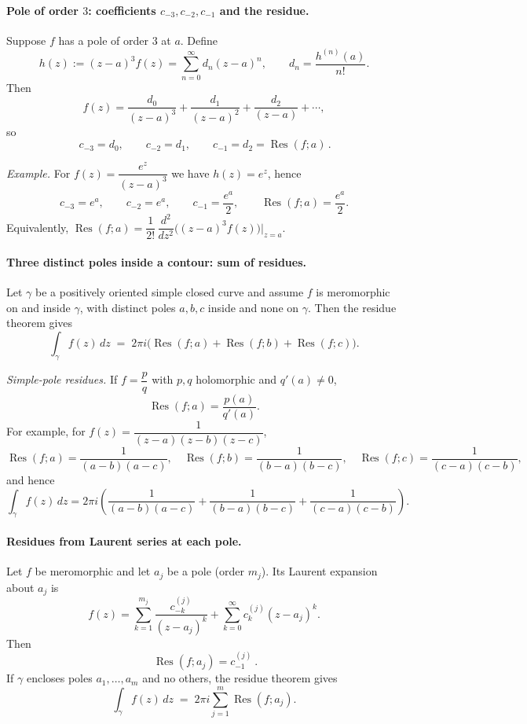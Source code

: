 \documentclass[11pt,a4paper]{article}
\theoremstyle{definition}
\theoremstyle{definition}
\theoremstyle{plain}
\theoremstyle{remark}
\DeclareMathOperator{\Res}{Res}
\begin{document}
\paragraph{Pole of order $3$: coefficients $c_{-3},c_{-2},c_{-1}$ and the residue.}
Suppose $f$ has a pole of order $3$ at $a$. Define
\[
h(z):=(z-a)^3 f(z)=\sum_{n=0}^{\infty} d_n (z-a)^n, \qquad d_n=\frac{h^{(n)}(a)}{n!}.
\]
Then
\[
f(z)=\frac{d_0}{(z-a)^3}+\frac{d_1}{(z-a)^2}+\frac{d_2}{(z-a)}+\cdots,
\]
so
\[
\boxed{\,c_{-3}=d_0,\qquad c_{-2}=d_1,\qquad c_{-1}=d_2=\Res(f;a)\,}.
\]

\emph{Example.} For $f(z)=\dfrac{e^{z}}{(z-a)^3}$ we have $h(z)=e^{z}$, hence
\[
c_{-3}=e^{a},\qquad c_{-2}=e^{a},\qquad c_{-1}=\frac{e^{a}}{2},\qquad \Res(f;a)=\frac{e^{a}}{2}.
\]
Equivalently, $\Res(f;a)=\dfrac{1}{2!}\,\dfrac{d^2}{dz^2}\big((z-a)^3 f(z)\big)\big|_{z=a}$.

\medskip
\paragraph{Three distinct poles inside a contour: sum of residues.}
Let $\gamma$ be a positively oriented simple closed curve and assume $f$ is meromorphic on and inside $\gamma$,
with distinct poles $a,b,c$ inside and none on $\gamma$. Then the residue theorem gives
\[
\boxed{\ \int_{\gamma} f(z)\,dz \;=\; 2\pi i\big(\Res(f;a)+\Res(f;b)+\Res(f;c)\big). \ }
\]

\emph{Simple-pole residues.}
If $f=\dfrac{p}{q}$ with $p,q$ holomorphic and $q'(a)\neq 0$,
\[
\Res(f;a)=\frac{p(a)}{q'(a)}.
\]
For example, for $f(z)=\dfrac{1}{(z-a)(z-b)(z-c)}$,
\[
\Res(f;a)=\frac{1}{(a-b)(a-c)},\quad
\Res(f;b)=\frac{1}{(b-a)(b-c)},\quad
\Res(f;c)=\frac{1}{(c-a)(c-b)},
\]
and hence
\[
\int_{\gamma} f(z)\,dz
= 2\pi i\!\left(\frac{1}{(a-b)(a-c)}+\frac{1}{(b-a)(b-c)}+\frac{1}{(c-a)(c-b)}\right).
\]

\paragraph{Residues from Laurent series at each pole.}
Let $f$ be meromorphic and let $a_j$ be a pole (order $m_j$). Its Laurent expansion about $a_j$ is
\[
f(z)=\sum_{k=1}^{m_j}\frac{c^{(j)}_{-k}}{(z-a_j)^k}+\sum_{k=0}^{\infty} c^{(j)}_{k}(z-a_j)^k.
\]
Then
\[
\boxed{\ \operatorname{Res}(f;a_j)=c^{(j)}_{-1}\ }.
\]
If $\gamma$ encloses poles $a_1,\dots,a_m$ and no others, the residue theorem gives
\[
\int_\gamma f(z)\,dz \;=\;2\pi i\sum_{j=1}^m \operatorname{Res}(f;a_j).
\]
\end{document}
